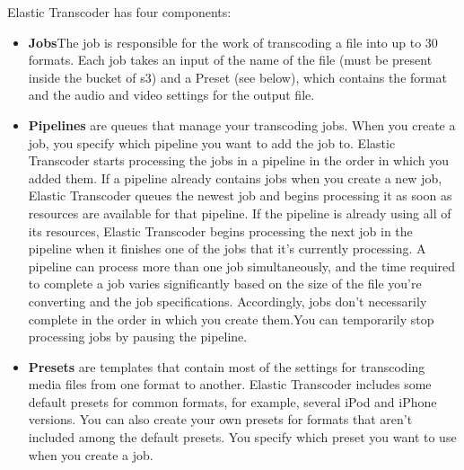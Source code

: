 Elastic Transcoder has four components:
\begin{itemize}



\item \textbf{Jobs}The job is responsible for the work of transcoding a file into up to 30 formats. Each job takes an input of the name of the file (must be present inside the bucket of s3) and a Preset (see below), which contains the format and the audio and video settings for the output file.


\item \textbf{Pipelines} are queues that manage your transcoding jobs. When you create a job, you specify which pipeline you want to add the job to. Elastic Transcoder starts processing the jobs in a pipeline in the order in which you added them. If a pipeline already contains jobs when you create a new job, Elastic Transcoder queues the newest job and begins processing it as soon as resources are available for that pipeline. If the pipeline is already using all of its resources, Elastic Transcoder begins processing the next job in the pipeline when it finishes one of the jobs that it's currently processing. A pipeline can process more than one job simultaneously, and the time required to complete a job varies significantly based on the size of the file you're converting and the job specifications. Accordingly, jobs don't necessarily complete in the order in which you create them.You can temporarily stop processing jobs by pausing the pipeline.\cite{s3_et}

\item \textbf{Presets} are templates that contain most of the settings for transcoding media files from one format to another. Elastic Transcoder includes some default presets for common formats, for example, several iPod and iPhone versions. You can also create your own presets for formats that aren't included among the default presets. You specify which preset you want to use when you create a job.\cite{s3_et}


\end{itemize}
